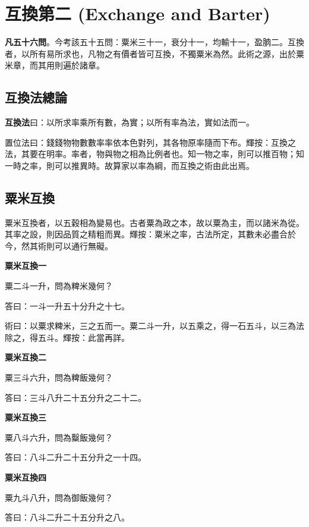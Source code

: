 \documentclass[11pt,a4paper]{article}
\newenvironment{problemenv}[1]{%
  \medskip\noindent\textbf{#1}\par\nopagebreak\smallskip
}{\medskip}
\begin{document}
\newpage
\section{互換第二 (Exchange and Barter)}

\textbf{凡五十六問}。今考該五十五問：粟米三十一，衰分十一，均輸十一，盈朒二。互換者，以所有易所求也，凡物之有價者皆可互換，不獨粟米為然。此術之源，出於粟米章，而其用則遍於諸章。

\subsection{互換法總論}

\textbf{互換法}曰：以所求率乘所有數，為實；以所有率為法，實如法而一。

置位法曰：錢錢物物數數率率依本色對列，其各物原率隨而下布。輝按：互換之法，其要在明率。率者，物與物之相為比例者也。知一物之率，則可以推百物；知一時之率，則可以推異時。故算家以率為綱，而互換之術由此出焉。

\subsection{粟米互換}

粟米互換者，以五穀相為變易也。古者粟為政之本，故以粟為主，而以諸米為從。其率之設，則因品質之精粗而異。輝按：粟米之率，古法所定，其數未必盡合於今，然其術則可以通行無礙。

\begin{problemenv}{粟米互換一}
粟二斗一升，問為粺米幾何？

\textsf{答曰：}一斗一升五十分升之十七。

\textsf{術曰：}以粟求粺米，三之五而一。粟二斗一升，以五乘之，得一石五斗，以三為法除之，得五斗。輝按：此當再詳。
\end{problemenv}

\begin{problemenv}{粟米互換二}
粟三斗六升，問為粺飯幾何？

\textsf{答曰：}三斗八升二十五分升之二十二。
\end{problemenv}

\begin{problemenv}{粟米互換三}
粟八斗六升，問為糳飯幾何？

\textsf{答曰：}八斗二升二十五分升之一十四。
\end{problemenv}

\begin{problemenv}{粟米互換四}
粟九斗八升，問為御飯幾何？

\textsf{答曰：}八斗二升二十五分升之八。
\end{problemenv}
\end{document}
